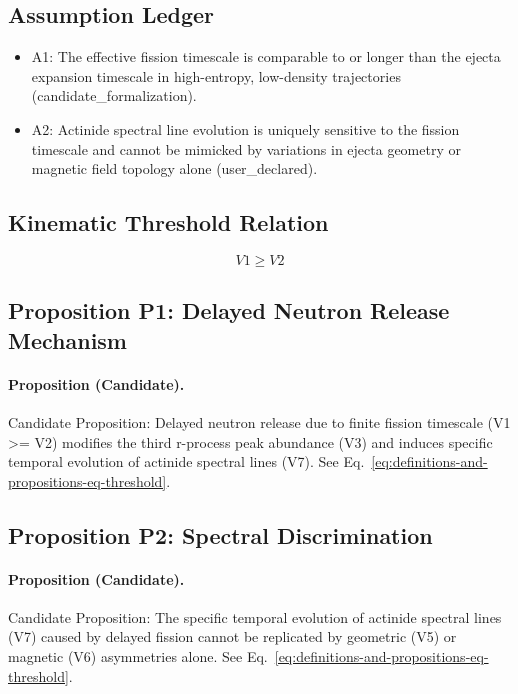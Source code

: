 \documentclass[conference]{IEEEtran}
\begin{document}
\subsection{Assumption Ledger}
\begin{itemize}
\item A1: The effective fission timescale is comparable to or longer than the ejecta expansion timescale in high-entropy, low-density trajectories (candidate\_formalization).
\item A2: Actinide spectral line evolution is uniquely sensitive to the fission timescale and cannot be mimicked by variations in ejecta geometry or magnetic field topology alone (user\_declared).
\end{itemize}

\subsection{Kinematic Threshold Relation}
\begin{equation}
V1 \geq V2
\label{eq:definitions-and-propositions-eq-threshold}
\end{equation}

\subsection{Proposition P1: Delayed Neutron Release Mechanism}
\paragraph{Proposition (Candidate).} Candidate Proposition: Delayed neutron release due to finite fission timescale (V1 >= V2) modifies the third r-process peak abundance (V3) and induces specific temporal evolution of actinide spectral lines (V7). See Eq.~\eqref{eq:definitions-and-propositions-eq-threshold}.

\subsection{Proposition P2: Spectral Discrimination}
\paragraph{Proposition (Candidate).} Candidate Proposition: The specific temporal evolution of actinide spectral lines (V7) caused by delayed fission cannot be replicated by geometric (V5) or magnetic (V6) asymmetries alone. See Eq.~\eqref{eq:definitions-and-propositions-eq-threshold}.
\end{document}
